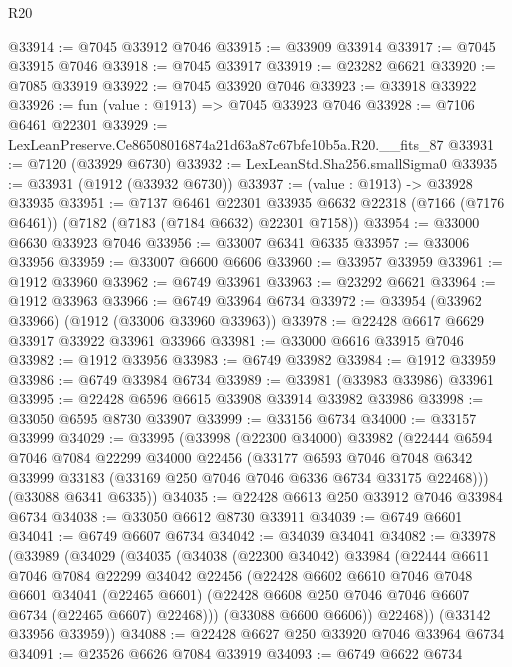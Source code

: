 \begin{lexlean}{R20}
\begin{coremodule}
{@33914 := @7045 @33912 @7046
@33915 := @33909 @33914
@33917 := @7045 @33915 @7046
@33918 := @7045 @33917
@33919 := @23282 @6621
@33920 := @7085 @33919
@33922 := @7045 @33920 @7046
@33923 := @33918 @33922
@33926 := fun (value : @1913) => @7045 @33923 @7046
@33928 := @7106 @6461 @22301
@33929 := LexLeanPreserve.Ce86508016874a21d63a87c67bfe10b5a.R20.__fits_87
@33931 := @7120 (@33929 @6730)
@33932 := LexLeanStd.Sha256.smallSigma0
@33935 := @33931 (@1912 (@33932 @6730))
@33937 := (value : @1913) -> @33928 @33935
@33951 := @7137
    @6461
    @22301
    @33935
    @6632
    @22318
    (@7166 (@7176 @6461))
    (@7182 (@7183 (@7184 @6632) @22301 @7158))
@33954 := @33000 @6630 @33923 @7046
@33956 := @33007 @6341 @6335
@33957 := @33006 @33956
@33959 := @33007 @6600 @6606
@33960 := @33957 @33959
@33961 := @1912 @33960
@33962 := @6749 @33961
@33963 := @23292 @6621
@33964 := @1912 @33963
@33966 := @6749 @33964 @6734
@33972 := @33954 (@33962 @33966) (@1912 (@33006 @33960 @33963))
@33978 := @22428 @6617 @6629 @33917 @33922 @33961 @33966
@33981 := @33000 @6616 @33915 @7046
@33982 := @1912 @33956
@33983 := @6749 @33982
@33984 := @1912 @33959
@33986 := @6749 @33984 @6734
@33989 := @33981 (@33983 @33986) @33961
@33995 := @22428 @6596 @6615 @33908 @33914 @33982 @33986
@33998 := @33050 @6595 @8730 @33907
@33999 := @33156 @6734
@34000 := @33157 @33999
@34029 := @33995
    (@33998
      (@22300 @34000)
      @33982
      (@22444
        @6594
        @7046
        @7084
        @22299
        @34000
        @22456
        (@33177
          @6593
          @7046
          @7048
          @6342
          @33999
          @33183
          (@33169 @250 @7046 @7046 @6336 @6734 @33175 @22468)))
      (@33088 @6341 @6335))
@34035 := @22428 @6613 @250 @33912 @7046 @33984 @6734
@34038 := @33050 @6612 @8730 @33911
@34039 := @6749 @6601
@34041 := @6749 @6607 @6734
@34042 := @34039 @34041
@34082 := @33978
    (@33989
      (@34029
        (@34035
          (@34038
            (@22300 @34042)
            @33984
            (@22444
              @6611
              @7046
              @7084
              @22299
              @34042
              @22456
              (@22428
                @6602
                @6610
                @7046
                @7048
                @6601
                @34041
                (@22465 @6601)
                (@22428 @6608 @250 @7046 @7046 @6607 @6734 (@22465 @6607) @22468)))
            (@33088 @6600 @6606))
          @22468))
      (@33142 @33956 @33959))
@34088 := @22428 @6627 @250 @33920 @7046 @33964 @6734
@34091 := @23526 @6626 @7084 @33919
@34093 := @6749 @6622 @6734
}
\end{coremodule}
\end{lexlean}
